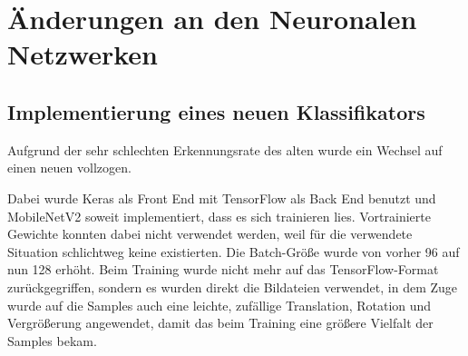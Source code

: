 \documentclass[12pt,a4paper,ngerman,enabledeprecatedfontcommands]{scrreprt}
\begin{document}
\section{Änderungen an den Neuronalen Netzwerken}
\subsection{Implementierung eines neuen Klassifikators}
\label{subsec:neuer-klassifikator}
Aufgrund der sehr schlechten Erkennungsrate des alten   wurde ein Wechsel auf einen neuen  vollzogen. 

Dabei wurde \gls{Keras} als Front End mit TensorFlow als Back End benutzt und MobileNetV2 soweit implementiert, dass es sich trainieren lies. Vortrainierte Gewichte konnten dabei nicht verwendet werden, weil für die verwendete Situation schlichtweg keine existierten. Die Batch-Größe wurde von vorher 96 auf nun 128 erhöht. Beim Training wurde nicht mehr auf das TensorFlow-Format zurückgegriffen, sondern es wurden direkt die Bildateien verwendet, in dem Zuge wurde auf die \gls{Sample}s auch eine leichte, zufällige Translation, Rotation und Vergrößerung angewendet, damit das  beim Training eine größere Vielfalt der \gls{Sample}s bekam.\\
\end{document}
